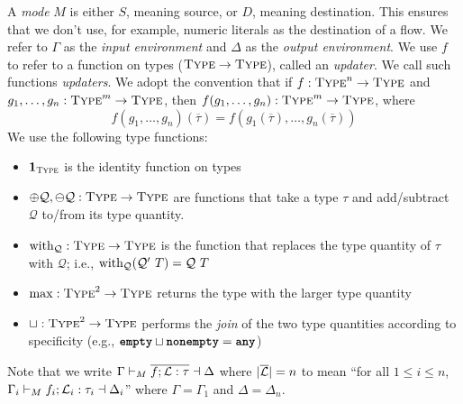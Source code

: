 \documentclass[nonacm, dvipsnames, sigconf]{acmart}
\begin{document}
A \emph{mode} $M$ is either $S$, meaning source, or $D$, meaning destination.
This ensures that we don't use, for example, numeric literals as the destination of a flow.
We refer to $\Gamma$ as the \emph{input environment} and $\Delta$ as the \emph{output environment}.
We use $f$ to refer to a function on types ($\textsc{Type} \to \textsc{Type}$), called an \emph{updater}.
We call such functions \emph{updaters}.
We adopt the convention that if $f : \textsc{Type}^n \to \textsc{Type}$ and $g_1,\ldots,g_n : \textsc{Type}^m \to \textsc{Type}$, then $f(g_1, \ldots, g_n) : \textsc{Type}^m \to \textsc{Type}$, where
\[
    f(g_1, \ldots, g_n)(\overline{\tau}) = f(g_1(\overline{\tau}), \ldots, g_n(\overline{\tau}))
\]
We use the following type functions:
\begin{itemize}
    \item $\bm{1}_{\textsc{Type}}$ is the identity function on types
    \item $\oplus \mathcal{Q}, \ominus \mathcal{Q} : \textsc{Type} \to \textsc{Type}$ are functions that take a type $\tau$ and add/subtract $\mathcal{Q}$ to/from its type quantity.
    \item $\text{with}_{\mathcal{Q}} : \textsc{Type} \to \textsc{Type}$ is the function that replaces the type quantity of $\tau$ with $\mathcal{Q}$; i.e., $\text{with}_{\mathcal{Q}}(\mathcal{Q}'~T) = \mathcal{Q}~T$
    \item $\max : \textsc{Type}^2 \to \textsc{Type}$ returns the type with the larger type quantity
    \item $\sqcup : \textsc{Type}^2 \to \textsc{Type}$ performs the \emph{join} of the two type quantities according to specificity (e.g., $\textbf{\texttt{empty}} \sqcup \textbf{\texttt{nonempty}} = \textbf{\texttt{any}}$)
\end{itemize}


Note that we write $\Gamma \vdash_M \overline{f ; \mathcal{L} : \tau} \dashv \Delta$ where $|\overline{\mathcal{L}}| = n$ to mean
``for all $1 \leq i \leq n$, $\Gamma_i \vdash_M f_i ; \mathcal{L}_i : \tau_i \dashv \Delta_i$'' where $\Gamma = \Gamma_1$ and $\Delta = \Delta_n$.
\end{document}
